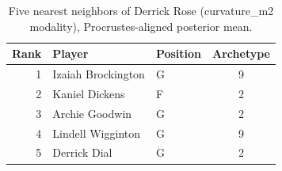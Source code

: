 \begin{table}[htbp]
  \centering\small
  \begin{tabular}{rllc}
    \toprule
    Rank & Player & Position & Archetype \\
    \midrule
    1 & Izaiah Brockington & G & 9 \\
    2 & Kaniel Dickens & F & 2 \\
    3 & Archie Goodwin & G & 2 \\
    4 & Lindell Wigginton & G & 9 \\
    5 & Derrick Dial & G & 2 \\
    \bottomrule
  \end{tabular}
  \caption{Five nearest neighbors of Derrick Rose (curvature_m2 modality), Procrustes-aligned posterior mean.}
  \label{tab:Derrick_Rose_neighbors_curvature_m2}
\end{table}

